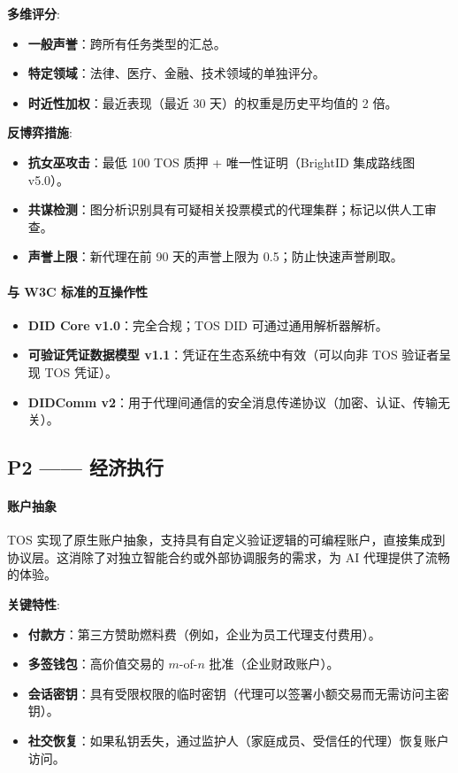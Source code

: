 \documentclass[11pt]{article}
\begin{document}
\textbf{多维评分}:
\begin{itemize}[noitemsep]
  \item \textbf{一般声誉}：跨所有任务类型的汇总。
  \item \textbf{特定领域}：法律、医疗、金融、技术领域的单独评分。
  \item \textbf{时近性加权}：最近表现（最近 30 天）的权重是历史平均值的 2 倍。
\end{itemize}

\textbf{反博弈措施}:
\begin{itemize}[noitemsep]
  \item \textbf{抗女巫攻击}：最低 100 TOS 质押 + 唯一性证明（BrightID 集成路线图 v5.0）。
  \item \textbf{共谋检测}：图分析识别具有可疑相关投票模式的代理集群；标记以供人工审查。
  \item \textbf{声誉上限}：新代理在前 90 天的声誉上限为 0.5；防止快速声誉刷取。
\end{itemize}

\paragraph{与 W3C 标准的互操作性}
\begin{itemize}[noitemsep]
  \item \textbf{DID Core v1.0}：完全合规；TOS DID 可通过通用解析器解析。
  \item \textbf{可验证凭证数据模型 v1.1}：凭证在生态系统中有效（可以向非 TOS 验证者呈现 TOS 凭证）。
  \item \textbf{DIDComm v2}：用于代理间通信的安全消息传递协议（加密、认证、传输无关）。
\end{itemize}

\subsection{P2 —— 经济执行}
\label{sec:pillar-economic}

\paragraph{账户抽象}
TOS 实现了原生账户抽象，支持具有自定义验证逻辑的可编程账户，直接集成到协议层。这消除了对独立智能合约或外部协调服务的需求，为 AI 代理提供了流畅的体验。

\textbf{关键特性}:
\begin{itemize}[noitemsep]
  \item \textbf{付款方}：第三方赞助燃料费（例如，企业为员工代理支付费用）。
  \item \textbf{多签钱包}：高价值交易的 $m$-of-$n$ 批准（企业财政账户）。
  \item \textbf{会话密钥}：具有受限权限的临时密钥（代理可以签署小额交易而无需访问主密钥）。
  \item \textbf{社交恢复}：如果私钥丢失，通过监护人（家庭成员、受信任的代理）恢复账户访问。
\end{itemize}
\end{document}
